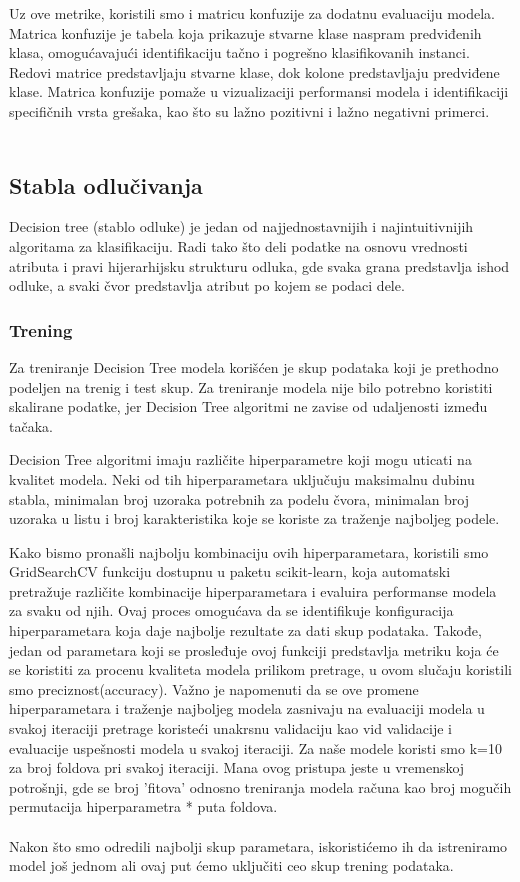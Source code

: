 \documentclass[a4paper,12pt]{article}
\begin{document}
Uz ove metrike, koristili smo i matricu konfuzije za dodatnu evaluaciju modela. Matrica konfuzije je tabela koja prikazuje stvarne klase naspram predviđenih klasa, omogućavajući identifikaciju tačno i pogrešno klasifikovanih instanci. Redovi matrice predstavljaju stvarne klase, dok kolone predstavljaju predviđene klase. Matrica konfuzije pomaže u vizualizaciji performansi modela i identifikaciji specifičnih vrsta grešaka, kao što su lažno pozitivni i lažno negativni primerci.\\\\


\subsection{Stabla odlučivanja}
Decision tree (stablo odluke) je jedan od najjednostavnijih i najintuitivnijih algoritama za klasifikaciju. Radi tako što deli podatke na osnovu vrednosti atributa i pravi hijerarhijsku strukturu odluka, gde svaka grana predstavlja ishod odluke, a svaki čvor predstavlja atribut po kojem se podaci dele.


\subsubsection{Trening}

Za treniranje Decision Tree modela korišćen je skup podataka koji je prethodno podeljen na trenig i test skup. Za treniranje modela nije bilo potrebno koristiti skalirane podatke, jer Decision Tree algoritmi ne zavise od udaljenosti između tačaka.

Decision Tree algoritmi imaju različite hiperparametre koji mogu uticati na kvalitet modela. Neki od tih hiperparametara uključuju maksimalnu dubinu stabla, minimalan broj uzoraka potrebnih za podelu čvora, minimalan broj uzoraka u listu i broj karakteristika koje se koriste za traženje najboljeg podele.

Kako bismo pronašli najbolju kombinaciju ovih hiperparametara, koristili smo GridSearchCV funkciju dostupnu u paketu scikit-learn, koja automatski pretražuje različite kombinacije hiperparametara i evaluira performanse modela za svaku od njih. Ovaj proces omogućava da se identifikuje konfiguracija hiperparametara koja daje najbolje rezultate za dati skup podataka. Takođe, jedan od parametara koji se prosleđuje ovoj funkciji predstavlja metriku koja će se koristiti za procenu kvaliteta modela prilikom pretrage, u ovom slučaju koristili smo preciznost(accuracy). Važno je napomenuti da se ove promene hiperparametara i traženje najboljeg modela zasnivaju na evaluaciji modela u svakoj iteraciji pretrage koristeći unakrsnu validaciju kao vid validacije i evaluacije uspešnosti modela u svakoj iteraciji. Za naše modele koristi smo k=10 za broj foldova pri svakoj iteraciji. Mana ovog pristupa jeste u vremenskoj potrošnji, gde se broj 'fitova' odnosno treniranja modela računa kao broj mogučih permutacija hiperparametra * puta foldova.
\\\\Nakon što smo odredili najbolji skup parametara, iskoristićemo ih da istreniramo model još jednom ali ovaj put ćemo uključiti ceo skup trening podataka.
\end{document}
